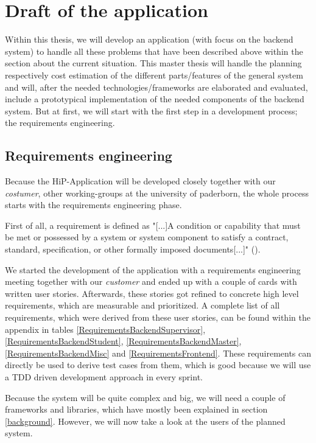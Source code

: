 \chapter[Draft of the application]{Draft of the application}
Within this thesis, we will develop an application (with focus on the backend system) to handle all these problems that have been described above within the section about the current situation. This master thesis will handle the planning respectively cost estimation of the different parts/features of the general system and will, after the needed technologies/frameworks are elaborated and evaluated, include a prototypical implementation of the needed components of the backend system. 
But at first, we will start with the first step in a development process; the requirements engineering.

\section{Requirements engineering}
Because the HiP-Application will be developed closely together with our \textit{costumer}, other working-groups at the university of paderborn, the whole process starts with the requirements engineering phase.

First of all, a requirement is defined as "[...]A condition or capability that must be met or possessed by a system or system component to satisfy a contract, standard, specification, or other formally imposed documents[...]" (\cite{IEEEReq}).

We started the development of the application with a requirements engineering meeting together with our \textit{customer} and ended up with a couple of cards with written user stories. Afterwards, these stories got refined to concrete high level requirements, which are measurable and prioritized. A complete list of all requirements, which were derived from these user stories, can be found within the appendix in tables \ref{RequirementsBackendSupervisor}, \ref{RequirementsBackendStudent}, \ref{RequirementsBackendMaster}, \ref{RequirementsBackendMisc} and \ref{RequirementsFrontend}. These requirements can directly be used to derive test cases from them, which is good because we will use a \ac{TDD} driven development approach in every sprint. 

Because the system will be quite complex and big, we will need a couple of frameworks and libraries, which have mostly been explained in section \ref{background}. However, we will now take a look at the users of the planned system.

